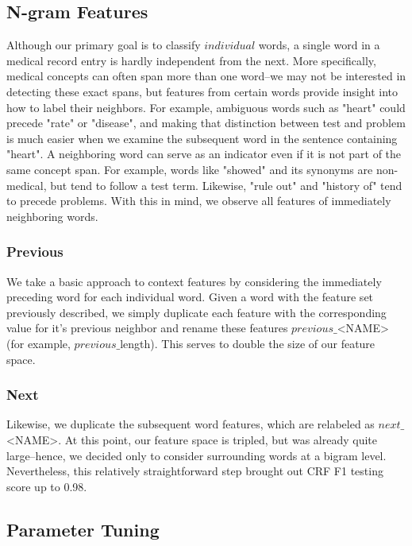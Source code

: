 \documentclass[preprint]{style}
\begin{document}
\subsection{N-gram Features}
Although our primary goal is to classify $individual$ words, a single word in a medical record entry is hardly independent from the next.  More specifically, medical concepts can often span more than one word--we may not be interested in detecting these exact spans, but features from certain words provide insight into how to label their neighbors. For example, ambiguous words such as "heart" could precede "rate" or "disease", and making that distinction between test and problem is much easier when we examine the subsequent word in the sentence containing "heart". A neighboring word can serve as an indicator even if it is not part of the same concept span. For example, words like "showed" and its synonyms are non-medical, but tend to follow a test term. Likewise, "rule out" and "history of" tend to precede problems. With this in mind, we observe all features of immediately neighboring words. 

\subsubsection{Previous}
We take a basic approach to context features by considering the immediately preceding word for each individual word. Given a word with the feature set previously described, we simply duplicate each feature with the corresponding value for it's previous neighbor and rename these features $previous\_$<NAME> (for example, $previous\_$length).  This serves to double the size of our feature space.
\subsubsection{Next}
Likewise, we duplicate the subsequent word features, which are relabeled as $next\_$<NAME>. At this point, our feature space is tripled, but was already quite large--hence, we decided only to consider surrounding words at a bigram level. Nevertheless, this relatively straightforward step brought out CRF F1 testing score up to 0.98.

\subsection{Parameter Tuning}
\end{document}

